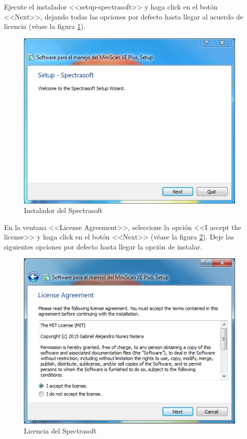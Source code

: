 Ejecute el instalador <<setup-spectrasoft>> y haga click en el bot\'{o}n <<Next>>, dejando todas las opciones por defecto hasta llegar al acuerdo de licencia (v\'{e}ase la figura \ref{fig:spectrasoft-setup}).
\vfill
\begin{figure}[H]
  \centering
  \includegraphics[width=.5\linewidth]{./img/spectrasoft-setup.jpg}
\caption[]{Instalador del Spectrasoft\label{fig:spectrasoft-setup}}
\end{figure}
\vfill
En la ventana <<License Agreement>>, seleccione la opci\'{o}n <<I accept the license>> y haga click en el bot\'{o}n <<Next>> (v\'{e}ase la figura \ref{fig:spectrasoft-licencia}). Deje las siguientes opciones por defecto hasta llegar la opci\'{o}n de instalar.
\vfill
\begin{figure}[H]
  \centering
  \includegraphics[width=.5\linewidth]{./img/spectrasoft-licencia.jpg}
\caption[]{Licencia del Spectrasoft\label{fig:spectrasoft-licencia}}
\end{figure}
\vfill
\newpage

